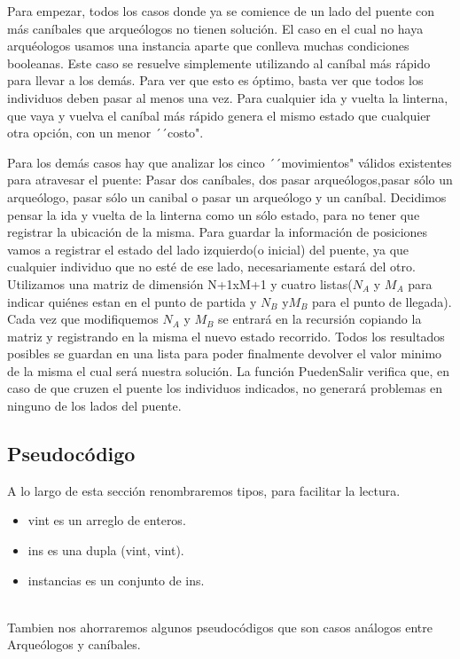 \documentclass[spanish,12pt]{article}
\begin{document}
Para empezar, todos los casos donde ya se comience de un lado del puente con más caníbales que arqueólogos no tienen solución.
El caso en el cual no haya arquéologos usamos una instancia aparte que conlleva muchas condiciones booleanas. Este caso se resuelve simplemente utilizando al caníbal más rápido para llevar a los demás. Para ver que esto es óptimo, basta ver que todos los individuos deben pasar al menos una vez. Para cualquier ida y vuelta la linterna, que vaya y vuelva el caníbal más rápido genera el mismo estado que cualquier otra opción, con un menor ´´costo".

 
Para los demás casos hay que analizar los cinco ´´movimientos"  válidos existentes para atravesar el puente: Pasar dos caníbales, dos pasar arqueólogos,pasar sólo un arqueólogo, pasar sólo un canibal o pasar un arqueólogo y un caníbal.
Decidimos pensar la ida y vuelta de la linterna como un sólo estado, para no tener que registrar la ubicación de la misma.
Para guardar la información de posiciones vamos a registrar el estado del lado izquierdo(o inicial) del puente, ya que cualquier individuo que no esté de ese lado, necesariamente estará del otro. Utilizamos una matriz de dimensión N+1xM+1 y cuatro listas($N_A$ y $M_A$ para indicar quiénes estan en el punto de partida y $N_B$ y$ M_B$ para el punto de llegada). Cada vez que modifiquemos $N_A$ y $M_B$ se entrará en la recursión copiando la matriz y registrando en la misma el nuevo estado recorrido. 
Todos los resultados posibles se guardan en una lista para poder finalmente devolver el valor minimo de la misma el cual será nuestra solución.
La función PuedenSalir verifica que, en caso de que cruzen el puente los individuos indicados, no generará problemas en ninguno de los lados del puente.



\subsection{Pseudocódigo}

A lo largo de esta sección renombraremos tipos, para facilitar la lectura.
\begin{itemize}
	\item vint es un arreglo de enteros.
	\item ins es una dupla (vint, vint).
	\item instancias es un conjunto de ins.
\end{itemize}
\\
Tambien nos ahorraremos algunos pseudocódigos que son casos análogos entre Arqueólogos y caníbales.
\end{document}
